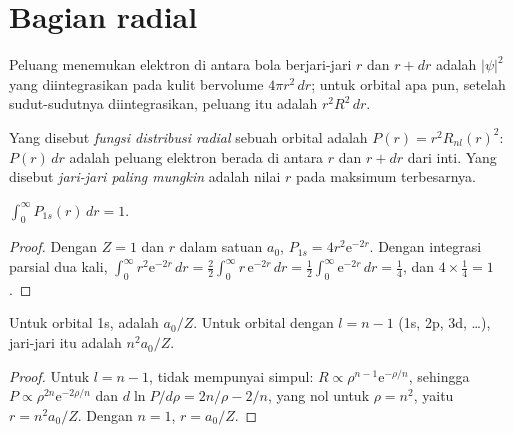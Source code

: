 \section{Bagian radial}

Peluang menemukan elektron di antara bola berjari-jari $r$ dan $r +
dr$ adalah $|\psi|^2$ yang diintegrasikan pada kulit bervolume
$4\pi r^2\,dr$; untuk orbital apa pun, setelah sudut-sudutnya
diintegrasikan, peluang itu adalah $r^2R^2\,dr$.

\begin{definition}\label{def:b2:atomic-orbitals:radial-distribution}
Yang disebut \emph{fungsi distribusi radial}
sebuah orbital adalah $P(r) = r^2R_{nl}(r)^2$: $P(r)\,dr$ adalah peluang
elektron berada di antara $r$ dan $r + dr$ dari inti. Yang disebut
\emph{jari-jari paling mungkin} adalah
nilai $r$ pada maksimum terbesarnya.
\end{definition}

\begin{proposition}[Normalisasi 1s]\label{prop:b2:atomic-orbitals:normalised}
$\int_0^\infty P_{1s}(r)\,dr = 1$.
\end{proposition}

\begin{proof}
Dengan $Z = 1$ dan $r$ dalam satuan $a_0$, $P_{1s} = 4r^2\mathrm e^{-2r}$.
Dengan integrasi parsial dua kali,
$\int_0^\infty r^2\mathrm e^{-2r}\,dr = \frac22\int_0^\infty r\,\mathrm e^{-2r}\,dr =
\frac12\int_0^\infty\mathrm e^{-2r}\,dr = \frac14$, dan $4 \times \frac14 = 1$.
\end{proof}

\begin{proposition}\label{prop:b2:atomic-orbitals:most-probable}
Untuk orbital 1s,  adalah $a_0/Z$. Untuk orbital
dengan $l =
n - 1$ (1s, 2p, 3d, \dots), jari-jari itu adalah $n^2a_0/Z$.
\end{proposition}

\begin{proof}
Untuk $l = n - 1$,  tidak mempunyai simpul:
$R \propto \rho^{n-1}\mathrm e^{-\rho/n}$, sehingga
$P \propto \rho^{2n}\mathrm e^{-2\rho/n}$ dan $d\ln P/d\rho = 2n/\rho - 2/n$,
yang nol untuk $\rho = n^2$, yaitu $r = n^2a_0/Z$. Dengan $n = 1$,
$r = a_0/Z$.
\end{proof}


